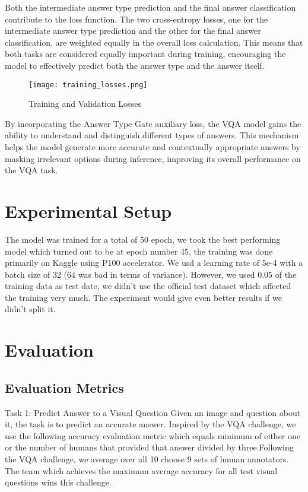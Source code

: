\documentclass[final,5p,times,twocolumn,authoryear]{elsarticle}
\begin{document}
Both the intermediate answer type prediction and the final answer classification contribute to the loss function. The two cross-entropy losses, one for the intermediate answer type prediction and the other for the final answer classification, are weighted equally in the overall loss calculation. This means that both tasks are considered equally important during training, encouraging the model to effectively predict both the answer type and the answer itself.

\begin{figure}
	\centering 
	\texttt{[image: training\_losses.png]}	
	\caption{Training and Validation Losses} 
	\label{fig_mom0}%
\end{figure}

By incorporating the Answer Type Gate auxiliary loss, the VQA model gains the ability to understand and distinguish different types of answers. This mechanism helps the model generate more accurate and contextually appropriate answers by masking irrelevant options during inference, improving its overall performance on the VQA task.


\section{Experimental Setup}


The model was trained for a total of 50 epoch, we took the best performing model which turned out to be at epoch number 45, the training was done primarily on Kaggle using P100 accelerator. We usd a learning rate of 5e-4 with a batch size of 32 (64 was bad in terms of variance). However, we used 0.05 of the training data as test date, we didn't use the official test dataset which affected the training very much. The experiment would give even better results if we didn't split it.



\section{Evaluation}
\subsection{Evaluation Metrics}
Task 1: Predict Answer to a Visual Question
Given an image and question about it, the task is to predict an accurate answer. Inspired by the VQA challenge, we use the following accuracy evaluation metric which equals minimum of either one or the number of humans that provided that answer divided by three.Following the VQA challenge, we average over all 10 choose 9 sets of human annotators. The team which achieves the maximum average accuracy for all test visual questions wins this challenge.
\end{document}

